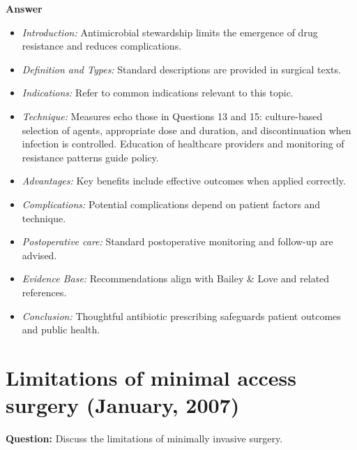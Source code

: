 \documentclass{article}
\begin{document}
\textbf{Answer}
\begin{itemize}

\item \emph{Introduction:} Antimicrobial stewardship limits the emergence of drug resistance and reduces complications.
\item \emph{Definition and Types:} Standard descriptions are provided in surgical texts.
\item \emph{Indications:} Refer to common indications relevant to this topic.

\item \emph{Technique:} Measures echo those in Questions 13 and 15: culture-based selection of agents, appropriate dose and duration, and discontinuation when infection is controlled. Education of healthcare providers and monitoring of resistance patterns guide policy.
\item \emph{Advantages:} Key benefits include effective outcomes when applied correctly.
\item \emph{Complications:} Potential complications depend on patient factors and technique.
\item \emph{Postoperative care:} Standard postoperative monitoring and follow-up are advised.
\item \emph{Evidence Base:} Recommendations align with Bailey \& Love and related references.

\item \emph{Conclusion:} Thoughtful antibiotic prescribing safeguards patient outcomes and public health.


\end{itemize}

\section{Limitations of minimal access surgery (January, 2007)}

\textbf{Question:} Discuss the limitations of minimally invasive surgery.
\end{document}
